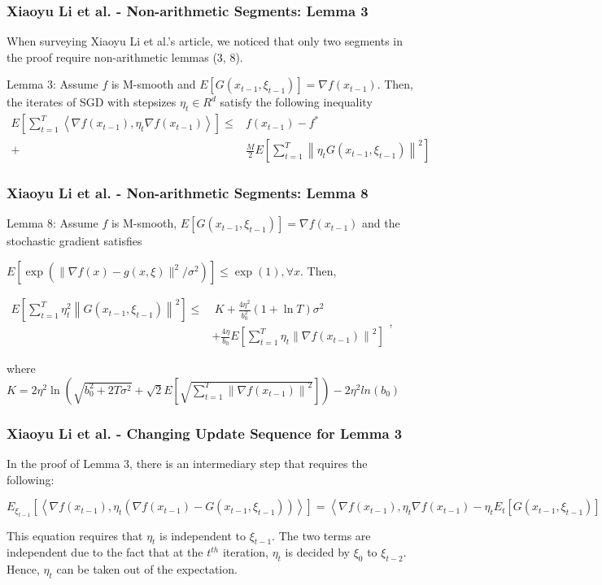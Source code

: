 \documentclass{beamer}
\begin{document}
\begin{frame}
\frametitle{Xiaoyu Li et al. - Non-arithmetic Segments: Lemma 3}
When surveying Xiaoyu Li et al.'s article, we noticed that only two segments in the proof require non-arithmetic lemmas (3, 8).\par
\vspace{5mm}
Lemma 3: Assume $f$ is M-smooth and $E[G(x_{t-1},\xi_{t-1})]=\nabla f(x_{t-1})$. 
Then, the iterates of SGD with stepsizes $\eta_t \in R^{d}$ satisfy the following inequality
$\begin{aligned} E\left[\sum_{t=1}^T\left\langle\nabla f\left(x_{t-1}\right), \eta_t \nabla f\left(x_{t-1}\right)\right\rangle\right] \leq & f\left(x_{t-1}\right)-f^* \\  +\ &\frac{M}{2} E\left[\sum_{t=1}^T\left\|\eta_t G\left(x_{t-1}, \xi_{t-1}\right)\right\|^2\right]\end{aligned}$
\end{frame}

\begin{frame}
\frametitle{Xiaoyu Li et al. - Non-arithmetic Segments: Lemma 8}
Lemma 8: Assume $f$ is M-smooth, $E[G(x_{t-1},\xi_{t-1})]=\nabla f(x_{t-1})$ and the stochastic gradient satisfies \par\vspace{3mm}$E\left[\exp \left(\|\nabla f(x)-g(x, \xi)\|^2 / \sigma^2\right)\right] \leq \exp (1), \forall x$. Then, \par\vspace{3mm}
$\begin{aligned} E\left[\sum_{t=1}^T \eta_t^2\left\|G\left(x_{t-1}, \xi_{t-1}\right)\right\|^2\right] \leq &\ K+\frac{4 \eta^2}{b_0^2}(1+\ln T) \sigma^2 \\ & +\frac{4 \eta}{b_0} E\left[\sum_{t=1}^T \eta_t\left\|\nabla f\left(x_{t-1}\right)\right\|^2\right]
\end{aligned}$, \par\vspace{3mm} where \\
$K=2 \eta^2 \ln \left(\sqrt{b_0^2+2 T \sigma^2}+\sqrt{2} E\left[\sqrt{\sum_{t=1}^T\left\|\nabla f\left(x_{t-1}\right)\right\|^2}\right]\right)-2\eta^2 ln(b_0)$
\end{frame}

\begin{frame}
\frametitle{Xiaoyu Li et al. - Changing Update Sequence for Lemma 3}
In the proof of Lemma 3, there is an intermediary step that requires the following:
\par\vspace{5mm}
$E_{\xi_{t-1}}\left[\left\langle\nabla f\left(x_{t-1}\right), \eta_t\left(\nabla f\left(x_{t-1}\right)-G\left(x_{t-1}, \xi_{t-1}\right)\right)\right\rangle\right]=\left\langle\nabla f\left(x_{t-1}\right), \eta_t \nabla f\left(x_{t-1}\right)-\eta_t E_t\left[G\left(x_{t-1}, \xi_{t-1}\right)\right]\right\rangle=0$
\par\vspace{5mm}
This equation requires that $\eta_t$ is independent to $\xi_{t-1}$. The two terms are independent due to the fact that at the $t^{th}$ iteration, $\eta_t$ is decided by $\xi_0$ to $\xi_{t-2}$. Hence, $\eta_t$ can be taken out of the expectation.
\end{frame}
\end{document}
